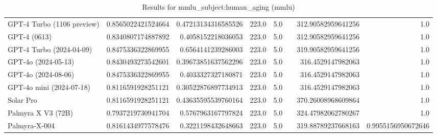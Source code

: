 \begin{table}[htp]
{\begin{tabular}{lrrrrrrr}
GPT-4 Turbo (1106 preview) & 0.8565022421524664 & 0.47213134316585526 & 223.0 & 5.0 &  & 312.90582959641256 & 1.0 \\
GPT-4 (0613) & 0.8340807174887892 & 0.4058152218036053 & 223.0 & 5.0 &  & 312.90582959641256 & 1.0 \\
GPT-4 Turbo (2024-04-09) & 0.8475336322869955 & 0.6564141239286003 & 223.0 & 5.0 &  & 319.90582959641256 & 1.0 \\
GPT-4o (2024-05-13) & 0.8430493273542601 & 0.39673851637562296 & 223.0 & 5.0 &  & 316.4529147982063 & 1.0 \\
GPT-4o (2024-08-06) & 0.8475336322869955 & 0.4033327327180871 & 223.0 & 5.0 &  & 316.4529147982063 & 1.0 \\
GPT-4o mini (2024-07-18) & 0.8116591928251121 & 0.30522876897734913 & 223.0 & 5.0 &  & 316.4529147982063 & 1.0 \\
Solar Pro & 0.8116591928251121 & 0.43635595539760164 & 223.0 & 5.0 &  & 370.26008968609864 & 1.0 \\
Palmyra X V3 (72B) & 0.7937219730941704 & 0.5767963167797824 & 223.0 & 5.0 &  & 324.47982062780267 & 1.0 \\
Palmyra-X-004 & 0.8161434977578476 & 0.3221198432648663 & 223.0 & 5.0 &  & 319.88789237668163 & 0.9955156950672646 \\
\bottomrule
\end{tabular}}
\caption{Results for mmlu_subject:human_aging (mmlu)}
\label{fig:mmlu_subject:human_aging (mmlu)}
\end{table}